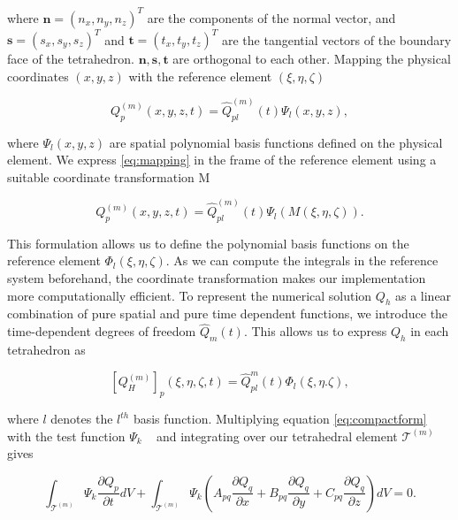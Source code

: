 where $\mathbf{n} = \left(n_x, n_y, n_z\right)^T$ are the components of the normal vector, and $\mathbf{s} = \left(s_x, s_y, s_z\right)^T$ and
$\mathbf{t} = \left(t_x, t_y, t_z\right)^T$ are the tangential vectors of the boundary face of the tetrahedron. $\mathbf{n}, \mathbf{s}, \mathbf{t}$
are orthogonal to each other. Mapping the physical coordinates $\left(x, y, z\right)$ with the reference element $\left(\xi, \eta, \zeta\right)$

\begin{equation}
    Q_p^{\left(m\right)} \left(x,y,z,t\right) = \hat{Q}_{pl}^{\left(m\right)} \left(t\right) \Psi_l \left(x, y, z\right),
    \label{eq:mapping}
\end{equation}

where $\Psi_l\left(x,y,z\right)$ are spatial polynomial basis functions defined on the physical element. We express \ref{eq:mapping} in 
the frame of the reference element using a suitable coordinate transformation M

\begin{equation}
     Q_p^{\left(m\right)}\left(x,y,z,t\right) = \hat{Q}_{pl}^{\left(m\right)}\left(t\right) \Psi_l\left(M\left(\xi, \eta, \zeta\right)\right).
\end{equation}

This formulation allows us to define the polynomial basis functions on the reference element $\Phi_l\left(\xi, \eta, \zeta\right)$.
As we can compute the integrals in the reference system beforehand, the coordinate transformation makes our implementation more computationally
efficient. To represent the numerical solution $Q_h$ as a linear combination of pure spatial and pure time dependent functions, we introduce
the time-dependent degrees of freedom $\hat{Q}_m\left(t\right)$. This allows us to express $Q_h$ in each tetrahedron as 

\begin{equation}
    \left[Q_H^{\left(m\right)}\right]_p \left(\xi, \eta, \zeta, t\right) = \hat{Q}_{pl}^m \left(t\right) \Phi_l \left(\xi, \eta. \zeta\right),
\label{eq:solution}
\end{equation}

where $l$ denotes the $l^{th}$ basis function. Multiplying equation \ref{eq:compactform} with the test function $\Psi_k$ ~\parencite{cockburn2011discontinuous}
and integrating over our tetrahedral element $\mathcal{T}^{\left(m\right)}$ gives

\begin{equation}
    \int_{\mathcal{T}^{\left(m\right)}} \Psi_k \frac{\partial Q_p}{\partial t} dV + \int_{\mathcal{T}^{\left(m\right)}} \Psi_k \left(A_{pq} 
    \frac{\partial Q_q}{\partial x} + B_{pq}\frac{\partial Q_q}{\partial y} + C_{pq}\frac{\partial Q_q}{\partial z}\right)dV = 0.
    \label{eq:preweakformulation}
\end{equation}

